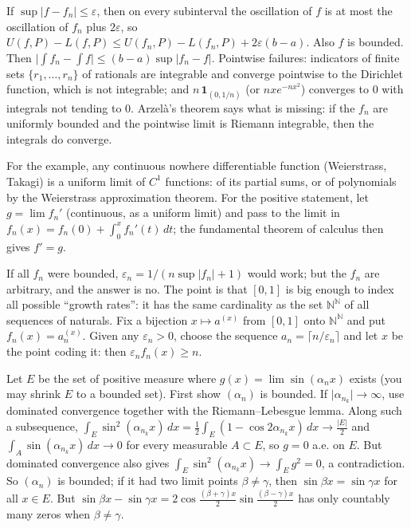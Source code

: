 \documentclass[11pt,a4paper]{article}
\begin{document}

If \(\sup\lvert f-f_n\rvert\le\varepsilon\), then on every subinterval the oscillation of \(f\) is at most the oscillation of \(f_n\) plus \(2\varepsilon\), so \(U(f,P)-L(f,P)\le U(f_n,P)-L(f_n,P)+2\varepsilon(b-a)\). Also \(f\) is bounded. Then \(\lvert\int f_n-\int f\rvert\le(b-a)\sup\lvert f_n-f\rvert\).
Pointwise failures: indicators of finite sets \(\{r_1,\dots,r_n\}\) of rationals are integrable and converge pointwise to the Dirichlet function, which is not integrable; and \(n\,\mathbf 1_{(0,1/n)}\) (or \(nxe^{-nx^2}\)) converges to \(0\) with integrals not tending to \(0\). Arzelà's theorem says what is missing: if the \(f_n\) are uniformly bounded and the pointwise limit is Riemann integrable, then the integrals do converge.

For the example, any continuous nowhere differentiable function (Weierstrass, Takagi) is a uniform limit of \(C^1\) functions: of its partial sums, or of polynomials by the Weierstrass approximation theorem.
For the positive statement, let \(g=\lim f_n'\) (continuous, as a uniform limit) and pass to the limit in \(f_n(x)=f_n(0)+\int_0^x f_n'(t)\,dt\); the fundamental theorem of calculus then gives \(f'=g\).

If all \(f_n\) were bounded, \(\varepsilon_n=1/(n\sup\lvert f_n\rvert+1)\) would work; but the \(f_n\) are arbitrary, and the answer is no. The point is that \([0,1]\) is big enough to index all possible ``growth rates'': it has the same cardinality as the set \(\mathbb N^{\mathbb N}\) of all sequences of naturals.
Fix a bijection \(x\mapsto a^{(x)}\) from \([0,1]\) onto \(\mathbb N^{\mathbb N}\) and put \(f_n(x)=a^{(x)}_n\). Given any \(\varepsilon_n\gt0\), choose the sequence \(a_n=\lceil n/\varepsilon_n\rceil\) and let \(x\) be the point coding it: then \(\varepsilon_nf_n(x)\ge n\).

Let \(E\) be the set of positive measure where \(g(x)=\lim\sin(\alpha_nx)\) exists (you may shrink \(E\) to a bounded set). First show \((\alpha_n)\) is bounded. If \(\lvert\alpha_{n_k}\rvert\to\infty\), use dominated convergence together with the Riemann--Lebesgue lemma.
Along such a subsequence, \(\int_E\sin^2(\alpha_{n_k}x)\,dx=\frac12\int_E(1-\cos 2\alpha_{n_k}x)\,dx\to\frac{\lvert E\rvert}2\) and \(\int_A\sin(\alpha_{n_k}x)\,dx\to0\) for every measurable \(A\subset E\), so \(g=0\) a.e. on \(E\). But dominated convergence also gives \(\int_E\sin^2(\alpha_{n_k}x)\to\int_E g^2=0\), a contradiction.
So \((\alpha_n)\) is bounded; if it had two limit points \(\beta\ne\gamma\), then \(\sin\beta x=\sin\gamma x\) for all \(x\in E\). But \(\sin\beta x-\sin\gamma x=2\cos\frac{(\beta+\gamma)x}2\sin\frac{(\beta-\gamma)x}2\) has only countably many zeros when \(\beta\ne\gamma\).
\end{document}
